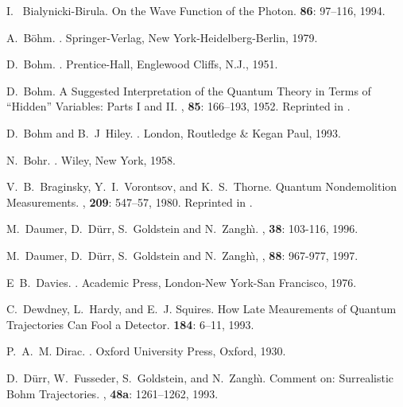 \documentclass[12pt]{article}
\begin{document}
\begin{thebibliography}{10}
 I.~ Bialynicki-Birula.  \newblock On the Wave
   Function of the Photon.   {\bf
     86}: 97--116, 1994.

 A.~B{\"o}hm.  .
   \newblock Springer-Verlag, New York-Heidelberg-Berlin, 1979.

 D.~Bohm.  .  \newblock
   Prentice-Hall, Englewood Cliffs, N.J., 1951.

 D.~Bohm.  \newblock A {S}uggested {I}nterpretation of
   the {Q}uantum {T}heory in {T}erms of ``{H}idden'' {V}ariables: Parts
   {I} and {II}.  , {\bf 85}: 166--193,
   1952.  \newblock Reprinted in \cite{WZ83}.

 D.~Bohm and B.~J~Hiley.  .
   \newblock London, Routledge \& Kegan Paul, 1993.

 N.~Bohr.  .  \newblock Wiley, New York, 1958.

 V.~B.~Braginsky, Y.~I.~Vorontsov, and K.~S.~Thorne.
   \newblock Quantum Nondemolition Measurements.  , {\bf 209}: 547--57, 1980.  \newblock Reprinted in
   \cite{WZ83}.

 M.~Daumer, D.~D\"urr, S.~Goldstein and N.~Zangh\`\i.
   ,  {\bf 38}: 103-116, 1996.

 M.~Daumer, D.~D\"urr, S.~Goldstein and N.~Zangh\`\i,
   ,
    {\bf 88}: 967-977, 1997.

 E~B.~Davies.  .  \newblock Academic Press, London-New York-San
   Francisco, 1976.


 C.~Dewdney, L.~Hardy, and E.~J. Squires.  \newblock
   How {L}ate {M}eaurements of {Q}uantum {T}rajectories {C}an {F}ool a
   {D}etector.   {\bf 184}: 6--11, 1993.

 P.~A.~M. Dirac.  .  \newblock Oxford University Press,
   Oxford, 1930.

 D.~D{\"u}rr, W.~Fusseder, S.~Goldstein, and
   N.~Zangh\`{\i}.  \newblock Comment on: {S}urrealistic {B}ohm
   {T}rajectories.  , {\bf 48a}:
   1261--1262, 1993.


\end{thebibliography}
\end{document}
